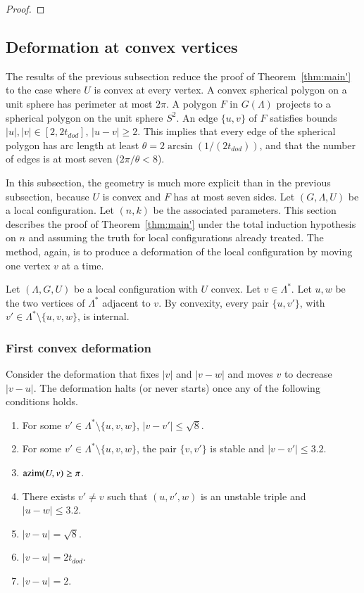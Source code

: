 \documentclass{article} %
\begin{document}
\begin{proof}
\end{proof}

\subsection{Deformation at convex vertices}

The results of the previous subsection
reduce the proof of Theorem~\ref{thm:main'} to
the case where $U$ is convex at every vertex.  A convex
spherical polygon on a unit sphere has perimeter
at most $2\pi$.  A polygon $F$ in $G(\Lambda)$ projects to
a spherical polygon on the unit sphere $S^2$.  An edge $\{u,v\}$ of
$F$ satisfies bounds $|u|,|v|\in[2,2t_{dod}]$, $|u-v|\ge 2$. This
implies that every edge of the spherical polygon has arc length
at least $\theta=2\arcsin(1/(2t_{dod}))$, and that the number
of edges is at most seven ($2\pi/\theta < 8$).

In this subsection, the geometry is much more explicit than in the
previous subsection, because $U$ is convex and $F$ has at most seven sides.
Let $(G,\Lambda,U)$ be a local configuration.
Let $(n,k)$ be the associated parameters.
This section describes the proof of Theorem~\ref{thm:main'} under 
the total induction hypothesis on $n$ and assuming the truth
for local configurations already treated.
The method, again, is to produce a deformation of the local
configuration by moving one vertex $v$ at a time.



Let $(\Lambda,G,U)$ be a local configuration with $U$ convex.
Let $v\in\Lambda^*$.  
Let $u,w$ be the two vertices of $\Lambda^*$
adjacent to $v$.  By convexity, every pair $\{u,v'\}$,
with $v'\in\Lambda^*\setminus\{u,v,w\}$, is internal.


\subsubsection{First convex deformation}

Consider the deformation that fixes $|v|$ and $|v-w|$ and
moves $v$ to decrease $|v-u|$.  
The deformation halts (or never starts) once any
of the following conditions holds.
\begin{enumerate}\label{e:halt-convex}
\item For some $v'\in\Lambda^*\setminus\{u,v,w\}$, 
$|v-v'|\le \sqrt8$.
\item For some $v'\in\Lambda^*\setminus\{u,v,w\}$,
the pair $\{v,v'\}$ is  stable and $|v-v'|\le 3.2$.
\item ${\operatorname{azim}}(U,v)\ge\pi$.
\item There exists $v'\ne v$ such that 
$(u,v',w)$ is an unstable triple and $|u-w|\le3.2$.
\item $|v-u|=\sqrt8$.
\item $|v-u|=2t_{dod}$.
\item $|v-u|=2$.
\end{enumerate}
\end{document}
